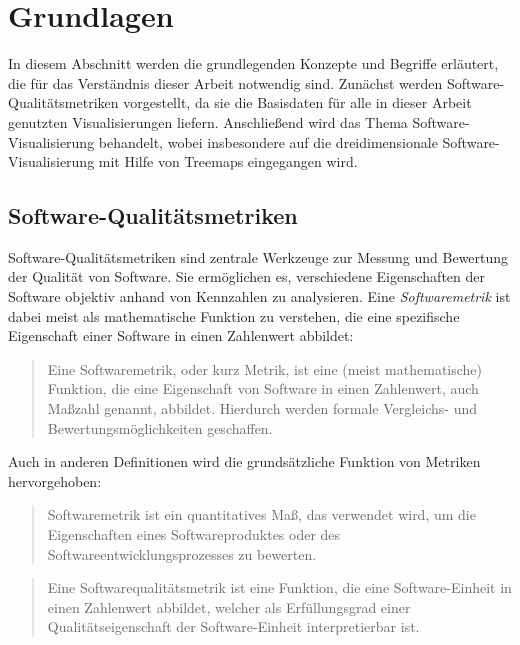 \section{Grundlagen} \label{sec:Grundlagen}
In diesem Abschnitt werden die grundlegenden Konzepte und Begriffe erläutert, die für das Verständnis dieser Arbeit notwendig sind. Zunächst werden Software-Qualitätsmetriken vorgestellt, da sie die Basisdaten für alle in dieser Arbeit genutzten Visualisierungen liefern. Anschließend wird das Thema Software-Visualisierung behandelt, wobei insbesondere auf die dreidimensionale Software-Visualisierung mit Hilfe von Treemaps eingegangen wird.

\subsection{Software-Qualitätsmetriken} \label{sec:SoftwareQualitaetsmetriken}

Software-Qualitätsmetriken sind zentrale Werkzeuge zur Messung und Bewertung der Qualität von Software. Sie ermöglichen es, verschiedene Eigenschaften der Software objektiv anhand von Kennzahlen zu analysieren. Eine \textit{Softwaremetrik} ist dabei meist als mathematische Funktion zu verstehen, die eine spezifische Eigenschaft einer Software in einen Zahlenwert abbildet:

\begin{quote}
    Eine Softwaremetrik, oder kurz Metrik, ist eine (meist mathematische) Funktion, die eine Eigenschaft von Software in einen Zahlenwert, auch Maßzahl genannt, abbildet. Hierdurch werden formale Vergleichs- und Bewertungsmöglichkeiten geschaffen.\cite{wikipedia_softwaremetrik}
\end{quote}

Auch in anderen Definitionen wird die grundsätzliche Funktion von Metriken hervorgehoben:

\begin{quote}
    Softwaremetrik ist ein quantitatives Maß, das verwendet wird, um die Eigenschaften eines Softwareproduktes oder des Softwareentwicklungsprozesses zu bewerten.\cite{softwaremetriken_2019}
\end{quote}

\begin{quote}
    Eine Softwarequalitätsmetrik ist eine Funktion, die eine Software-Einheit in einen Zahlenwert abbildet, welcher als Erfüllungsgrad einer Qualitätseigenschaft der Software-Einheit interpretierbar ist.\cite{def_qual_metric}
\end{quote}

